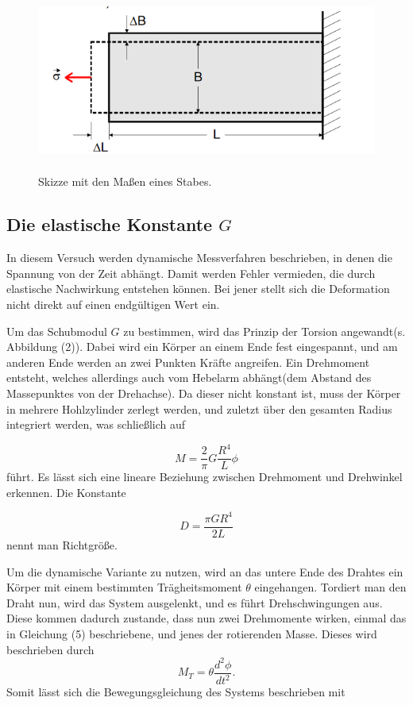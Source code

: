 \begin{figure}[H]
 \centering
  \includegraphics[height=6cm]{Screenshot (7).png}
  \caption{Skizze mit den Maßen eines Stabes.\cite{kent}}
  \label{fig:drill}
\end{figure}


\subsection{Die elastische Konstante $G$}

In diesem Versuch werden dynamische Messverfahren beschrieben, in denen die Spannung von der Zeit abhängt.
Damit werden Fehler vermieden, die durch elastische Nachwirkung entstehen können. Bei jener stellt sich die Deformation nicht direkt auf einen endgültigen Wert ein.

Um das Schubmodul $G$ zu bestimmen, wird das Prinzip der Torsion angewandt(s. Abbildung (2)). Dabei wird ein Körper an einem Ende fest eingespannt, und am anderen Ende werden an zwei Punkten Kräfte angreifen.
Ein Drehmoment entsteht, welches allerdings auch vom Hebelarm abhängt(dem Abstand des Massepunktes von der Drehachse).
Da dieser nicht konstant ist, muss der Körper in mehrere Hohlzylinder zerlegt werden, und zuletzt über den gesamten Radius integriert werden, was  schließlich auf

\begin{equation}
  M = \frac{2}{\pi}G\frac{R^{4}}{L}\phi
\end{equation}
führt. Es lässt sich eine lineare Beziehung zwischen Drehmoment und Drehwinkel erkennen.
Die Konstante 

\begin{equation}
  D = \frac{\pi G R^{4}}{2L}
\end{equation}
nennt man Richtgröße.

Um die dynamische Variante zu nutzen, wird an das untere Ende des Drahtes ein Körper mit einem bestimmten Trägheitsmoment $\theta$
eingehangen. Tordiert man den Draht nun, wird das System ausgelenkt, und es führt Drehschwingungen aus.
Diese kommen dadurch zustande, dass nun zwei Drehmomente wirken, einmal das in Gleichung (5) beschriebene, und jenes der rotierenden Masse.
Dieses wird beschrieben durch
\begin{equation}
  M_T = \theta \frac{d^{2}\phi}{dt^{2}} .
\end{equation}
Somit lässt sich die Bewegungsgleichung des Systems beschrieben mit

